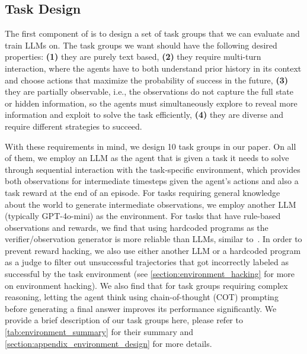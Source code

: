 \subsection{Task Design}


The first component of \ours{} is to design a set of task groups that we can evaluate and train LLMs on. The task groups we want should have the following desired properties: \textbf{(1)} they are purely text based, \textbf{(2)} they require multi-turn interaction, where the agents have to both understand prior history in its context and choose actions that maximize the probability of success in the future, \textbf{(3)} they are partially observable, i.e., the observations do not capture the full state or hidden information, so the agents must simultaneously explore to reveal more information and exploit to solve the task efficiently, \textbf{(4)} they are diverse and require different strategies to succeed. 


With these requirements in mind, we design 10 task groups in our paper. On all of them, we employ an LLM as the agent that is given a task it needs to solve through sequential interaction with the task-specific environment, which provides both observations for intermediate timesteps given the agent's actions and also a task reward at the end of an episode. 
For tasks requiring general knowledge about the world to generate intermediate observations, we employ another LLM (typically GPT-4o-mini) as the environment. For tasks that have rule-based observations and rewards, we find that using hardcoded programs as the verifier/observation generator is more reliable than LLMs, similar to~\citet{deepseekai2025deepseekr1incentivizingreasoningcapability}. In order to prevent reward hacking, we also use either another LLM or a hardcoded program as a judge to filter out unsuccessful trajectories that got incorrectly labeled as successful by the task environment (see \cref{section:environment_hacking} for more on environment hacking). We also find that for task groups requiring complex reasoning, letting the agent think using chain-of-thought (COT) prompting~\citep{wei2022chain, kojima2022large} before generating a final answer improves its performance significantly. We provide a brief description of our task groups here, please refer to \cref{tab:environment_summary} for their summary and \cref{section:appendix_environment_design} for more details.

